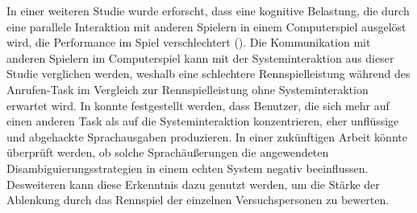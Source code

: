 \documentclass[12pt,a4paper]{scrartcl}
\begin{document}
In einer weiteren Studie wurde erforscht, dass eine kognitive Belastung, die durch eine parallele Interaktion mit anderen Spielern in einem Computerspiel ausgelöst wird, die Performance im Spiel verschlechtert (\cite{CLmmorpg}). Die Kommunikation mit anderen Spielern im Computerspiel kann mit der Systeminteraktion aus dieser Studie verglichen werden, weshalb eine schlechtere Rennspielleistung während des Anrufen-Task im Vergleich zur Rennspielleistung ohne Systeminteraktion erwartet wird. In \cite{Wozhcd} konnte festgestellt werden, dass Benutzer, die sich mehr auf einen anderen Task als auf die Systeminteraktion konzentrieren, eher unflüssige und abgehackte Sprachausgaben produzieren. In einer zukünftigen Arbeit könnte überprüft werden, ob solche Sprachäußerungen die angewendeten Disambiguierungsstrategien in einem echten System negativ beeinflussen.
Desweiteren kann diese Erkenntnis dazu genutzt werden, um die Stärke der Ablenkung durch das Rennspiel der einzelnen Versuchspersonen zu bewerten. 
\end{document}
